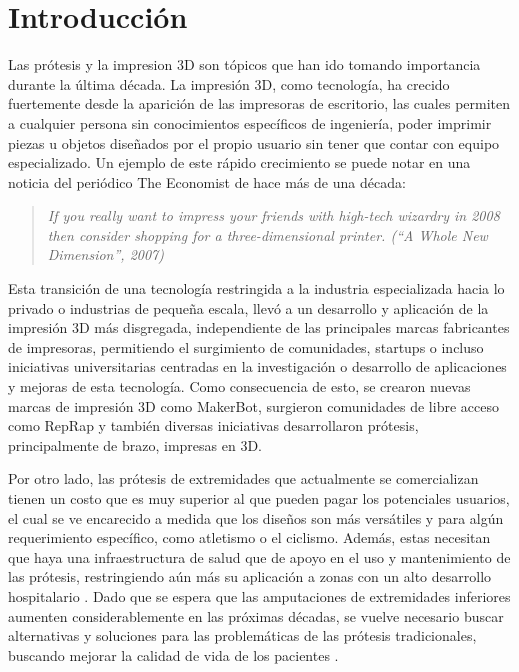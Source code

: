 \chapter{Introducción}

Las prótesis y la impresion 3D son tópicos que han ido tomando importancia durante la última década. La impresión 3D, como tecnología, ha crecido fuertemente desde la aparición de las impresoras de escritorio, las cuales permiten a cualquier persona sin conocimientos específicos de ingeniería, poder imprimir piezas u objetos diseñados por el propio usuario sin tener que contar con equipo especializado. Un ejemplo de este rápido crecimiento se puede notar en una noticia del periódico The Economist de hace más de una década: 

\begin{quote}
\textit{If you really want to impress your friends with high-tech wizardry in 2008 then consider shopping for a three-dimensional printer. (``A Whole New Dimension'', 2007)}
\end{quote}


Esta transición de una tecnología restringida a la industria especializada hacia lo privado o industrias de pequeña escala, llevó a un desarrollo y aplicación de la impresión 3D más disgregada, independiente de las principales marcas fabricantes de impresoras, permitiendo el surgimiento de comunidades, startups o incluso iniciativas universitarias centradas en la investigación o desarrollo de aplicaciones y mejoras de esta tecnología. Como consecuencia de esto, se crearon nuevas marcas de impresión 3D como MakerBot, surgieron comunidades de libre acceso como RepRap y también diversas iniciativas desarrollaron prótesis, principalmente de brazo, impresas en 3D.

Por otro lado, las prótesis de extremidades que actualmente se comercializan tienen un costo que es muy superior al que pueden pagar los potenciales usuarios, el cual se ve encarecido a medida que los diseños son más versátiles y para algún requerimiento específico, como atletismo o el ciclismo. Además, estas necesitan que haya una infraestructura de salud que de apoyo en el uso y mantenimiento de las prótesis, restringiendo aún más su aplicación a zonas con un alto desarrollo hospitalario \cite{vujaklija20183d}. Dado que se espera que las amputaciones de extremidades inferiores aumenten considerablemente en las próximas décadas, se vuelve necesario buscar alternativas y soluciones para las problemáticas de las prótesis tradicionales, buscando mejorar la calidad de vida de los pacientes \cite{franchignoni2015rasch}.

